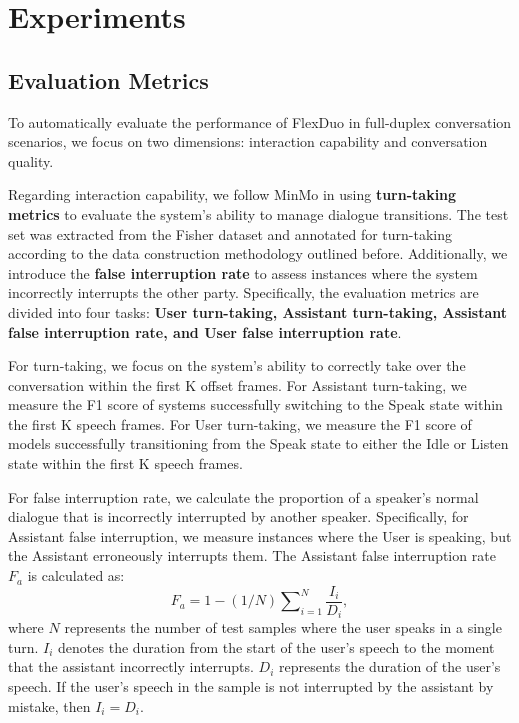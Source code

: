 \documentclass[11pt]{article}
\begin{document}
\section{Experiments}
\subsection{Evaluation Metrics}

To automatically evaluate the performance of FlexDuo in full-duplex conversation scenarios, we focus on two dimensions: interaction capability and conversation quality.

Regarding interaction capability, we follow MinMo \cite{chen2025MinMomultimodallargelanguage} in using \textbf{turn-taking metrics} to evaluate the system's ability to manage dialogue transitions. The test set was extracted from the Fisher dataset and annotated for turn-taking according to the data construction methodology outlined before. Additionally, we introduce the \textbf{false interruption rate} to assess instances where the system incorrectly interrupts the other party. Specifically, the evaluation metrics are divided into four tasks: \textbf{User turn-taking, Assistant turn-taking, Assistant false interruption rate, and User false interruption rate}.

For turn-taking, we focus on the system's ability to correctly take over the conversation within the first K offset frames. 
For Assistant turn-taking, we measure the F1 score of systems successfully switching to the Speak state within the first K speech frames. 
For User turn-taking, we measure the F1 score of models successfully transitioning from the Speak state to either the Idle or Listen state within the first K speech frames.

For false interruption rate, we calculate the proportion of a speaker's normal dialogue that is incorrectly interrupted by another speaker. 
Specifically, for Assistant false interruption, we measure instances where the User is speaking, but the Assistant erroneously interrupts them. The Assistant false interruption rate $F_a$ is calculated as:
\begin{equation}
  \label{eq4}
F_a = 1 - (1/N)\sum\nolimits_{i=1}^{N}\frac{I_i}{D_i},
\end{equation}
where $N$ represents the number of test samples where the user speaks in a single turn.
$I_i$ denotes the duration from the start of the user's speech to the moment that the assistant incorrectly interrupts.
$D_i$ represents the duration of the user's speech. If the user's speech in the sample is not interrupted by the assistant by mistake, then $I_i=D_i$.
\end{document}
